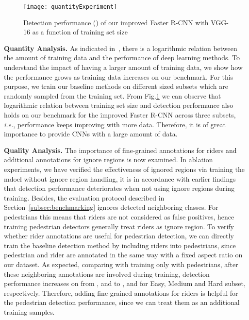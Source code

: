 \documentclass[journal]{IEEEtran}
\def\ie{{\em i.e.}}
\begin{document}
\begin{figure}[b]
\centering
\texttt{[image: quantityExperiment]}
\caption{Detection performance () of our improved Faster R-CNN with VGG-16 as a function of training set size}
\label{fig:quantity}
\end{figure} 

{\flushleft \textbf{Quantity Analysis. }}
As indicated in~\cite{DBLP:conf/iccv/SunSSG17}, there is a logarithmic relation between the amount of training data and the performance of deep learning methods. To understand the impact of having a larger amount of training data, we show how the performance grows as training data increases on our benchmark. For this purpose, we train our baseline methods on different sized subsets which are randomly sampled from the training set. From Fig.\ref{fig:quantity} we can observe that logarithmic relation between training set size and detection performance also holds on our benchmark for the improved Faster R-CNN across three subsets, \ie, performance keeps improving with more data. Therefore, it is of great importance to provide CNNs with a large amount of data.

{\flushleft \textbf{Quality Analysis. }}
The importance of fine-grained annotations for riders and additional annotations for ignore regions is now examined. In ablation experiments, we have verified the effectiveness of ignored regions via training the mdoel without ignore region handling, it is in accordance with earlier findings~\cite{DBLP:conf/cvpr/ZhangBS17} that detection performance deteriorates when not using ignore regions during training. Besides, the evaluation protocol described in Section~\ref{subsec:benchmarking} ignores detected neighboring classes. For pedestrians this means that riders are not considered as false positives, hence training pedestrian detectors generally treat riders as ignore region. To verify whether rider annotations are useful for pedestrian detection, we can directly train the baseline detection method by including riders into pedestrians, since pedestrian and rider are annotated in the same way with a fixed aspect ratio on our dataset. As expected, comparing with training only with pedestrians, after these neighboring annotations are involved during training, detection performance increases on  from ,  and  to ,  and  for Easy, Medium and Hard subset, respectively. Therefore, adding fine-grained annotations for riders is helpful for the pedestrian detection performance, since we can treat them as an additional training samples.
\end{document}
